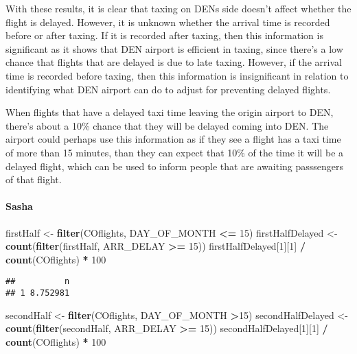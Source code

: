 \documentclass[]{article}
\newenvironment{Shaded}{\begin{snugshade}}{\end{snugshade}}
\newcommand{\KeywordTok}[1]{\textcolor[rgb]{0.13,0.29,0.53}{\textbf{#1}}}
\newcommand{\DecValTok}[1]{\textcolor[rgb]{0.00,0.00,0.81}{#1}}
\newcommand{\StringTok}[1]{\textcolor[rgb]{0.31,0.60,0.02}{#1}}
\newcommand{\OperatorTok}[1]{\textcolor[rgb]{0.81,0.36,0.00}{\textbf{#1}}}
\newcommand{\NormalTok}[1]{#1}
\let\oldparagraph\paragraph
\renewcommand{\paragraph}[1]{\oldparagraph{#1}\mbox{}}
\begin{document}
With these results, it is clear that taxing on DENs side doesn't affect
whether the flight is delayed. However, it is unknown whether the
arrival time is recorded before or after taxing. If it is recorded after
taxing, then this information is significant as it shows that DEN
airport is efficient in taxing, since there's a low chance that flights
that are delayed is due to late taxing. However, if the arrival time is
recorded before taxing, then this information is insignificant in
relation to identifying what DEN airport can do to adjust for preventing
delayed flights.

When flights that have a delayed taxi time leaving the origin airport to
DEN, there's about a 10\% chance that they will be delayed coming into
DEN. The airport could perhaps use this information as if they see a
flight has a taxi time of more than 15 minutes, than they can expect
that 10\% of the time it will be a delayed flight, which can be used to
inform people that are awaiting passsengers of that flight.

\paragraph{Sasha}\label{sasha}

\begin{Shaded}
\begin{Highlighting}[]
\NormalTok{ firstHalf <-}\StringTok{ }\KeywordTok{filter}\NormalTok{(COflights, DAY_OF_MONTH }\OperatorTok{<=}\StringTok{ }\DecValTok{15}\NormalTok{)}
\NormalTok{firstHalfDelayed <-}\StringTok{ }\KeywordTok{count}\NormalTok{(}\KeywordTok{filter}\NormalTok{(firstHalf, ARR_DELAY }\OperatorTok{>=}\StringTok{ }\DecValTok{15}\NormalTok{))}
\NormalTok{firstHalfDelayed[}\DecValTok{1}\NormalTok{][}\DecValTok{1}\NormalTok{] }\OperatorTok{/}\StringTok{ }\KeywordTok{count}\NormalTok{(COflights) }\OperatorTok{*}\StringTok{ }\DecValTok{100}
\end{Highlighting}
\end{Shaded}

\begin{verbatim}
##          n
## 1 8.752981
\end{verbatim}

\begin{Shaded}
\begin{Highlighting}[]
\NormalTok{secondHalf <-}\StringTok{ }\KeywordTok{filter}\NormalTok{(COflights, DAY_OF_MONTH }\OperatorTok{>}\DecValTok{15}\NormalTok{)}
\NormalTok{secondHalfDelayed <-}\StringTok{ }\KeywordTok{count}\NormalTok{(}\KeywordTok{filter}\NormalTok{(secondHalf, ARR_DELAY }\OperatorTok{>=}\StringTok{ }\DecValTok{15}\NormalTok{))}
\NormalTok{secondHalfDelayed[}\DecValTok{1}\NormalTok{][}\DecValTok{1}\NormalTok{] }\OperatorTok{/}\StringTok{ }\KeywordTok{count}\NormalTok{(COflights) }\OperatorTok{*}\StringTok{ }\DecValTok{100}
\end{Highlighting}
\end{Shaded}
\end{document}
